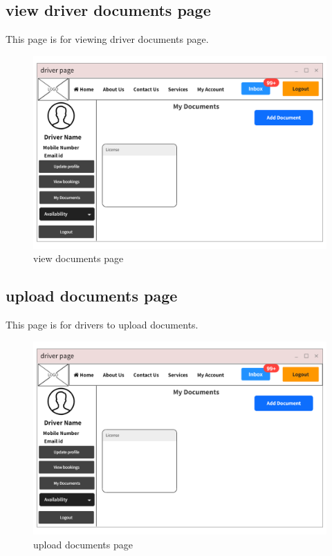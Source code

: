 \documentclass[a4paper,12pt,toc=flat]{report}
\begin{document}
	\pagebreak
	
	
		\subsection{view driver documents page}
\hspace*{12pt}
        This page is for viewing  driver documents page.
	\begin{figure}[bph]
	\begin{center}
		\includegraphics[width=1.1 \linewidth, height=0.7\textheight]{"driver_docs.png"}
	\end{center}
		\caption{ view documents page}
	\end{figure}

	\pagebreak
	
		\subsection{upload documents page}
\hspace*{12pt}
        This page is for drivers to upload documents.
	\begin{figure}[bph]
	\begin{center}
		\includegraphics[width=1.1 \linewidth, height=0.7\textheight]{"driver_docs.png"}
	\end{center}
		\caption{ upload documents page}
	\end{figure}
\end{document}

